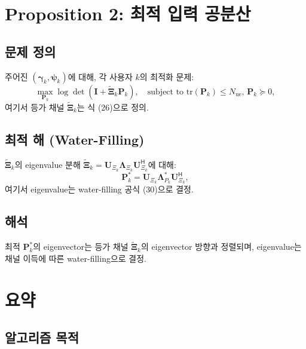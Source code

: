 \documentclass[10pt]{article}
\begin{document}
\section{Proposition 2: 최적 입력 공분산}

\subsection{문제 정의}

주어진 $(\boldsymbol{\gamma}_k, \boldsymbol{\psi}_k)$에 대해, 각 사용자 $k$의 최적화 문제:
\begin{equation}
\max_{\mathbf{P}_k} \log \det(\mathbf{I} + \widetilde{\boldsymbol{\Xi}}_k \mathbf{P}_k), \quad \text{subject to } \mathrm{tr}(\mathbf{P}_k) \leq N_{\text{ue}}, \, \mathbf{P}_k \succeq 0,
\end{equation}
여기서 등가 채널 $\widetilde{\boldsymbol{\Xi}}_k$는 식 (26)으로 정의.

\subsection{최적 해 (Water-Filling)}

$\widetilde{\boldsymbol{\Xi}}_k$의 eigenvalue 분해 $\widetilde{\boldsymbol{\Xi}}_k = \mathbf{U}_{\Xi_k} \boldsymbol{\Lambda}_{\Xi_k} \mathbf{U}_{\Xi_k}^{\mathsf{H}}$에 대해:
\begin{equation}
\mathbf{P}^*_k = \mathbf{U}_{\Xi_k} \boldsymbol{\Lambda}^*_{P_k} \mathbf{U}_{\Xi_k}^{\mathsf{H}}, \tag{29}
\end{equation}
여기서 eigenvalue는 water-filling 공식 (30)으로 결정.

\subsection{해석}

최적 $\mathbf{P}^*_k$의 eigenvector는 등가 채널 $\widetilde{\boldsymbol{\Xi}}_k$의 eigenvector 방향과 정렬되며, eigenvalue는 채널 이득에 따른 water-filling으로 결정.



\section{요약}

\subsection{알고리즘 목적}
\end{document}
